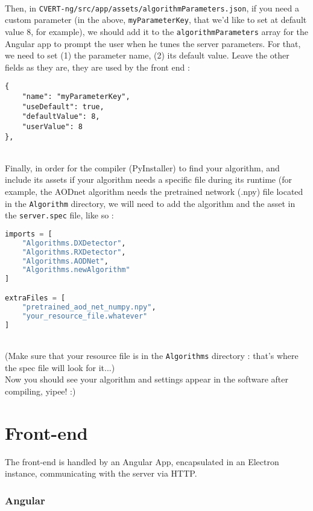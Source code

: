 \documentclass[12pt,a4paper]{article}
\begin{document}
~\\
Then, in \texttt{CVERT-ng/src/app/assets/algorithmParameters.json}, if you need a custom parameter (in the above, \texttt{myParameterKey}, that we'd like to set at default value 8, for example), we should add it to the \texttt{algorithmParameters} array for the Angular app to prompt the user when he tunes the server parameters. For that, we need to set (1) the parameter name, (2) its default value. Leave the other fields as they are, they are used by the front end :\\

\begin{lstlisting}
{
    "name": "myParameterKey",
    "useDefault": true,
    "defaultValue": 8,
    "userValue": 8
},
\end{lstlisting}

~\\
Finally, in order for the compiler (PyInstaller) to find your algorithm, and include its assets if your algorithm needs a specific file during its runtime (for example, the AODnet algorithm needs the pretrained network (.npy) file located in the \texttt{Algorithm} directory, we will need to add the algorithm and the asset in the \texttt{server.spec} file, like so :\\

\begin{lstlisting}[language=Python]
imports = [
    "Algorithms.DXDetector",
    "Algorithms.RXDetector",
    "Algorithms.AODNet",
    "Algorithms.newAlgorithm"
]

extraFiles = [
    "pretrained_aod_net_numpy.npy",
    "your_resource_file.whatever"
]
\end{lstlisting}
~\\
(Make sure that your resource file is in the \texttt{Algorithms} directory : that's where the spec file will look for it...)\\

Now you should see your algorithm and settings appear in the software after compiling, yipee! :)

\pagebreak

\part{Front-end}
\setcounter{section}{0}

The front-end is handled by an Angular App, encapsulated in an Electron instance, communicating with the server via HTTP.

\section{Angular}
\end{document}

